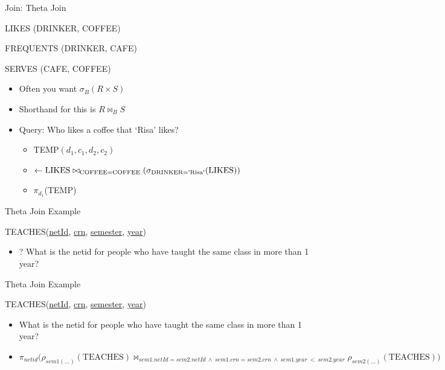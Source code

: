 \documentclass[aspectratio=169]{beamer}
\newenvironment{noindentitemize}
{ \begin{itemize}
 \setlength{\itemsep}{1.5ex}
  \setlength{\parsep}{0pt}   
  \setlength{\parskip}{0pt}
 \addtolength{\leftskip}{-2em}
 }
{ \end{itemize} }
\newenvironment{noindentitemize2}
{ \begin{itemize}
  \setlength{\itemsep}{0ex}
  \setlength{\parskip}{0pt}
  \setlength{\parsep}{0pt}   
  \addtolength{\leftskip}{-2em}  }
{ \end{itemize} }
\newcommand{\TEACHES}{\textrm{TEACHES}}
\newcommand{\LIKES}{\textrm{LIKES}}
\newcommand{\COFFEE}{\textrm{COFFEE}}
\newcommand{\DRINKER}{\textrm{DRINKER}}
\begin{document}
\begin{frame}{Join: Theta Join}

LIKES (DRINKER, COFFEE)

FREQUENTS (DRINKER, CAFE)

SERVES (CAFE, COFFEE)

\begin{noindentitemize}
\item Often you want $\sigma_B (R \times S)$
\item Shorthand for this is $R \bowtie_B S$
\item Query: Who likes a coffee that `Risa' likes?
	\begin{noindentitemize2}
	\item TEMP$(d_1, c_1, d_2, c_2)  $
	\item[] \hspace{1em} $\leftarrow \LIKES \bowtie_{\COFFEE = \COFFEE}
		(\sigma_{\DRINKER = \textrm{\textquotesingle{Risa}\textquotesingle}} (\LIKES))$
	\item $\pi_{d_1}$(TEMP)
	\end{noindentitemize2}
\end{noindentitemize}

\end{frame}


\begin{frame}{Theta Join Example}

TEACHES(\underline{netId}, \underline{crn}, \underline{semester}, \underline{year})

\begin{noindentitemize}
\item[?] What is the netid for people who have taught the same class in more than 1 year?
\end{noindentitemize}

\end{frame}


\begin{frame}{Theta Join Example}

TEACHES(\underline{netId}, \underline{crn}, \underline{semester}, \underline{year})

\begin{noindentitemize}
\item What is the netid for people who have taught the same class in more than 1 year?
\item $\pi_{netid}\Big(\rho_{sem1(\ldots)}(\TEACHES) \bowtie_{sem1.netId = sem2.netId\ \wedge\ sem1.crn = sem2.crn\ \wedge\ sem1.year\ <\ sem2.year} \rho_{sem2(\ldots)}(\TEACHES)\Big)$
\end{noindentitemize}

\end{frame}
\end{document}
